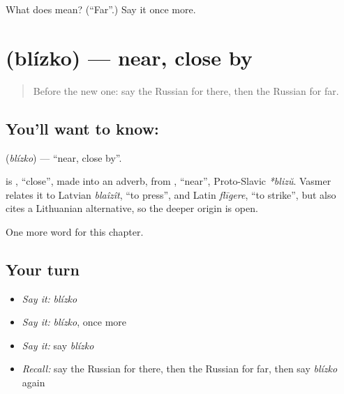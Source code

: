 \begin{tcolorbox}[breakable,colback=teal!4,colframe=teal!35!black,title={Before you move on}]
What does  mean? (\textquotedblleft{}Far\textquotedblright{}.) Say it once more.
\end{tcolorbox}
\section[\texorpdfstring{\ru{близко} (blízko)}{близко (blízko)}]{ (blízko) — near, close by}

\label{lesson:RU-C72-near}



\begin{quote}
Before the new one: say the Russian for there, then the Russian for far.
\end{quote}

\subsection*{You'll want to know: }
\textbf{} (\emph{blízko}) — \textquotedblleft{}near, close by\textquotedblright{}.

\begin{cousinweb}
\textbf{} is \emph{}, \textquotedblleft{}close\textquotedblright{}, made into an adverb, from \emph{}, \textquotedblleft{}near\textquotedblright{}, Proto-Slavic \emph{*blizŭ}. Vasmer relates it to Latvian \emph{blaîzît}, \textquotedblleft{}to press\textquotedblright{}, and Latin \emph{flīgere}, \textquotedblleft{}to strike\textquotedblright{}, but also cites a Lithuanian alternative, so the deeper origin is open.
\end{cousinweb}

\begin{grammarlens}[title={What you've built}]
One more word for this chapter.
\end{grammarlens}

\subsection*{Your turn}
\begin{itemize}
\raggedright
  \item \emph{Say it:} \emph{blízko}
  \item \emph{Say it:} \emph{blízko}, once more
  \item \emph{Say it:} say \emph{blízko}
  \item \emph{Recall:} say the Russian for there, then the Russian for far, then say \emph{blízko} again
\end{itemize}

